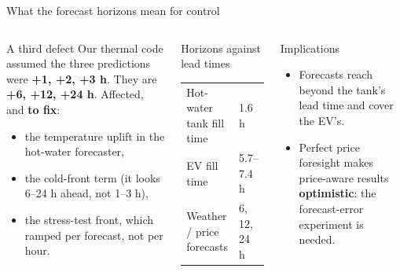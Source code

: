 \documentclass[aspectratio=169,10pt]{beamer}
\newcommand{\tagtodo}{\textcolor{stemsred}{\textbf{to fix}}}
\begin{document}
\begin{frame}{What the forecast horizons mean for control}
\begin{columns}[T]
\begin{alertblock}{A third defect}
Our thermal code assumed the three predictions were \textbf{+1, +2, +3 h}. They are \textbf{+6, +12, +24 h}. Affected, and \tagtodo:
\begin{itemize}
  \item the temperature uplift in the hot-water forecaster,
  \item the cold-front term (it looks 6--24 h ahead, not 1--3 h),
  \item the stress-test front, which ramped per forecast, not per hour.
\end{itemize}
\end{alertblock}
\begin{block}{Horizons against lead times}
\small
\begin{tabular}{@{}ll@{}}
\toprule
Hot-water tank fill time & 1.6 h \\
EV fill time & 5.7--7.4 h \\
Weather / price forecasts & 6, 12, 24 h \\
\bottomrule
\end{tabular}
\end{block}
\begin{block}{Implications}
\begin{itemize}
  \item Forecasts reach beyond the tank's lead time and cover the EV's.
  \item Perfect price foresight makes price-aware results \textbf{optimistic}: the forecast-error experiment is needed.
\end{itemize}
\end{block}
\end{columns}
\end{frame}
\end{document}
